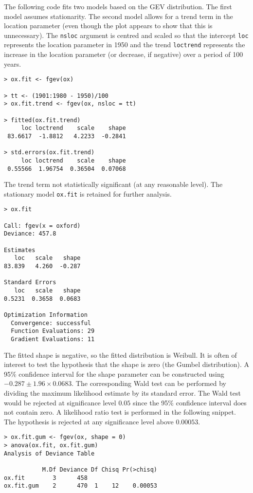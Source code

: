 \documentclass[11pt,a4paper]{article}
\begin{document}
The following code fits two models based on the GEV distribution.
The first model assumes stationarity. 
The second model allows for a trend term in the location parameter (even though the plot appears to show that this is unnecessary).
The \verb+nsloc+ argument is centred and scaled so that the intercept \verb+loc+ represents the location parameter in 1950 and the trend \verb+loctrend+ represents the increase in the location parameter (or decrease, if negative) over a period of 100 years.

\begin{verbatim}
> ox.fit <- fgev(ox)

> tt <- (1901:1980 - 1950)/100
> ox.fit.trend <- fgev(ox, nsloc = tt)

> fitted(ox.fit.trend)
     loc loctrend    scale    shape
 83.6617  -1.8812   4.2233  -0.2841

> std.errors(ox.fit.trend)
     loc loctrend    scale    shape
 0.55566  1.96754  0.36504  0.07068
\end{verbatim}

The trend term not statistically significant (at any reasonable level). 
The stationary model \verb+ox.fit+ is retained for further analysis.

\begin{verbatim}
> ox.fit

Call: fgev(x = oxford) 
Deviance: 457.8 

Estimates
   loc   scale   shape  
83.839   4.260  -0.287  

Standard Errors
   loc   scale   shape  
0.5231  0.3658  0.0683  

Optimization Information
  Convergence: successful 
  Function Evaluations: 29 
  Gradient Evaluations: 11 
\end{verbatim}

The fitted shape is negative, so the fitted distribution is Weibull.
It is often of interest to test the hypothesis that the shape is zero (the Gumbel distribution).
A 95\% confidence interval for the shape parameter can be constructed using $-0.287 \pm 1.96 \times 0.0683$.
The corresponding Wald test can be performed by dividing the maximum likelihood estimate by its standard error.
The Wald test would be rejected at significance level $0.05$ since the 95\% confidence interval does not contain zero.
A likelihood ratio test is performed in the following snippet.
The hypothesis is rejected at any significance level above $0.00053$.

\begin{verbatim}
> ox.fit.gum <- fgev(ox, shape = 0)
> anova(ox.fit, ox.fit.gum)
Analysis of Deviance Table

           M.Df Deviance Df Chisq Pr(>chisq)
ox.fit        3      458
ox.fit.gum    2      470  1    12    0.00053 
\end{verbatim}
 
\end{document}
